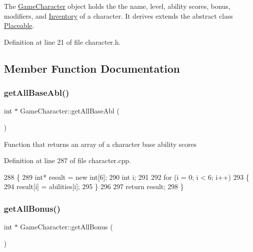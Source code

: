 The \hyperlink{class_game_character}{Game\+Character} object holds the the name, level, ability scores, bonus, modifiers, and \hyperlink{class_inventory}{Inventory} of a character. It derives extends the abstract class \hyperlink{class_placeable}{Placeable}. 

Definition at line 21 of file character.\+h.



\subsection{Member Function Documentation}
\hypertarget{class_game_character_a9b1de762235904d9f11147780ffb45f1}{}\label{class_game_character_a9b1de762235904d9f11147780ffb45f1} 
\subsubsection{\texorpdfstring{get\+All\+Base\+Abl()}{getAllBaseAbl()}}
{\footnotesize\ttfamily int $\ast$ Game\+Character\+::get\+All\+Base\+Abl (\begin{DoxyParamCaption}{ }\end{DoxyParamCaption})}

Function that returns an array of a character base ability scores 

Definition at line 287 of file character.\+cpp.


\begin{DoxyCode}
288 \{
289     \textcolor{keywordtype}{int}* result = \textcolor{keyword}{new} \textcolor{keywordtype}{int}[6];
290     \textcolor{keywordtype}{int} i;
291 
292     \textcolor{keywordflow}{for} (i = 0; i < 6; i++)
293     \{
294         result[i] = abilities[i];
295     \}
296 
297     \textcolor{keywordflow}{return} result;
298 \}
\end{DoxyCode}
\hypertarget{class_game_character_a369f58b909a9ac72e572cd5c65773779}{}\label{class_game_character_a369f58b909a9ac72e572cd5c65773779} 
\subsubsection{\texorpdfstring{get\+All\+Bonus()}{getAllBonus()}}
{\footnotesize\ttfamily int $\ast$ Game\+Character\+::get\+All\+Bonus (\begin{DoxyParamCaption}{ }\end{DoxyParamCaption})}

